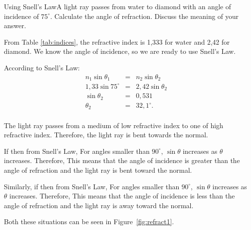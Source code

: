 \begin{wex}{Using Snell's Law}{A light ray passes from water to diamond with an angle of incidence of $75^{\circ}$. Calculate the angle of refraction. Discuss the meaning of your answer.}
{
From Table \ref{tab:indices}, the refractive index is 1,333 for water and 2,42 for diamond. We know the angle of incidence, so we are ready to use Snell's Law.

According to Snell's Law:
\begin{eqnarray*}
n_1 \sin{\theta_1} & = & n_2 \sin{\theta_2} \\
1,33 \sin{75^{\circ}} & = & 2,42 \sin{\theta_2} \\
\sin{\theta_2} & = & 0,531\\
\theta_2 & = & 32,1^{\circ}.\\
\end{eqnarray*}

The light ray passes from a medium of low refractive index to one of high refractive index. Therefore, the light ray is bent towards the normal.}
\end{wex}

If
then from Snell's Law,
For angles smaller than $90^{\circ}$, $\sin{\theta}$ increases as $\theta$ increases. Therefore,
This means that the angle of incidence is greater than the angle of refraction and the light ray is bent toward the normal.

Similarly, if
then from Snell's Law,
For angles smaller than $90^{\circ}$, $\sin{\theta}$ increases as $\theta$ increases. Therefore,
This means that the angle of incidence is less than the angle of refraction and the light ray is away toward the normal.

Both these situations can be seen in Figure~\ref{fig:refract1}.

